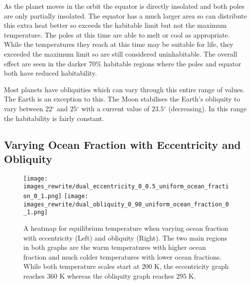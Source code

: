 \documentclass[12pt, onecolumn]{revtex4-2}    %
\newcommand{\degrees}{\ensuremath{^{\circ}}}
\begin{document}
As the planet moves in the orbit the equator is directly insolated and both poles are only partially insolated.
The equator has a much larger area so can distribute this extra heat better so exceeds the habitable limit but not the maximum temperature.
The poles at this time are able to melt or cool as appropriate.
While the temperatures they reach at this time may be suitable for life, they exceeded the maximum limit so are still considered uninhabitable.
The overall effect are seen in the darker 70\% habitable regions where the poles and equator both have reduced habitability.


Most planets have obliquities which can vary through this entire range of values.
The Earth is an exception to this. 
The Moon stabilises the Earth's obliquity to vary between $22\degrees$ and $25\degrees$ with a current value of $23.5\degrees$ (decreasing).
In this range the habitability is fairly constant.


\subsection{Varying Ocean Fraction with Eccentricity and Obliquity} \label{ssec:qualitative_oceanfraction}
%
\begin{figure}[t]
  \texttt{[image: images\_rewrite/dual\_eccentricity\_0\_0.5\_uniform\_ocean\_fraction\_0\_1.png]}
  \texttt{[image: images\_rewrite/dual\_obliquity\_0\_90\_uniform\_ocean\_fraction\_0\_1.png]}
  \caption{
    A heatmap for equilibrium temperature when varying ocean fraction with eccentricity (Left) and obliquity (Right).
    The two main regions in both graphs are the warm temperatures with higher ocean fraction and much colder temperatures with lower ocean fractions.
    While both temperature scales start at $200$ K, the eccentricity graph reaches $360$ K whereas the obliquity graph reaches $295$ K.
  }
  \label{fig:qualitative_oceanfraction}
\end{figure}
\end{document}
